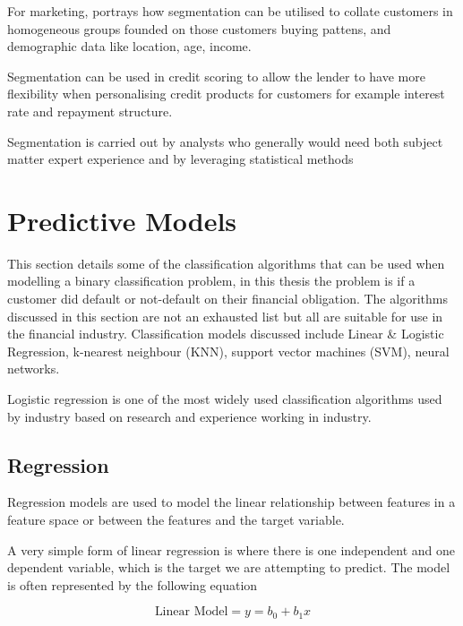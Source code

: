 For marketing, \cite{wedel_market_2012} portrays how segmentation can be utilised to collate customers in homogeneous groups founded on those customers buying pattens, and demographic data like location, age, income.

Segmentation can be used in credit scoring to allow the lender to have more flexibility when personalising credit products for customers for example interest rate and repayment structure\citep{kennedy_credit_2013}.

Segmentation is carried out by analysts who generally would need both subject matter expert experience and by leveraging statistical methods \citep{siddiqi_credit_2012}


\section{Predictive Models}\label{sec:predictModels}
This section details some of the classification algorithms that can be used when modelling a binary classification problem, in this thesis the problem is if a customer did default or not-default on their financial obligation. The algorithms discussed in this section are not an exhausted list but all are suitable for use in the financial industry. Classification models discussed include Linear \& Logistic Regression, k-nearest neighbour (KNN), support vector machines (SVM), neural networks. 

Logistic regression is one of the most widely used classification algorithms used by industry based on research and experience working in industry.

\subsection{Regression} \label{Reg}
Regression models are used to model the linear relationship between features in a feature space or between the features and the target variable. 

A very simple form of linear regression is where there is one independent and one dependent variable, which is the target we are attempting to predict. The model is often represented by the following equation

\begin{equation} \label{eq:reg}
	\text{Linear Model} = y = b_0 + b_1x
\end{equation}

